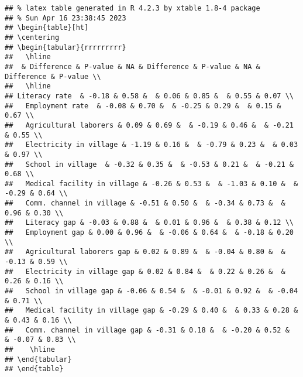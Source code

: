 \documentclass[
]{article}
\begin{document}
\begin{verbatim}
## % latex table generated in R 4.2.3 by xtable 1.8-4 package
## % Sun Apr 16 23:38:45 2023
## \begin{table}[ht]
## \centering
## \begin{tabular}{rrrrrrrrr}
##   \hline
##  & Difference & P-value & NA & Difference & P-value & NA & Difference & P-value \\ 
##   \hline
## Literacy rate  & -0.18 & 0.58 &  & 0.06 & 0.85 &  & 0.55 & 0.07 \\ 
##   Employment rate  & -0.08 & 0.70 &  & -0.25 & 0.29 &  & 0.15 & 0.67 \\ 
##   Agricultural laborers & 0.09 & 0.69 &  & -0.19 & 0.46 &  & -0.21 & 0.55 \\ 
##   Electricity in village & -1.19 & 0.16 &  & -0.79 & 0.23 &  & 0.03 & 0.97 \\ 
##   School in village  & -0.32 & 0.35 &  & -0.53 & 0.21 &  & -0.21 & 0.68 \\ 
##   Medical facility in village & -0.26 & 0.53 &  & -1.03 & 0.10 &  & -0.29 & 0.64 \\ 
##   Comm. channel in village & -0.51 & 0.50 &  & -0.34 & 0.73 &  & 0.96 & 0.30 \\ 
##   Literacy gap & -0.03 & 0.88 &  & 0.01 & 0.96 &  & 0.38 & 0.12 \\ 
##   Employment gap & 0.00 & 0.96 &  & -0.06 & 0.64 &  & -0.18 & 0.20 \\ 
##   Agricultural laborers gap & 0.02 & 0.89 &  & -0.04 & 0.80 &  & -0.13 & 0.59 \\ 
##   Electricity in village gap & 0.02 & 0.84 &  & 0.22 & 0.26 &  & 0.26 & 0.16 \\ 
##   School in village gap & -0.06 & 0.54 &  & -0.01 & 0.92 &  & -0.04 & 0.71 \\ 
##   Medical facility in village gap & -0.29 & 0.40 &  & 0.33 & 0.28 &  & 0.43 & 0.16 \\ 
##   Comm. channel in village gap & -0.31 & 0.18 &  & -0.20 & 0.52 &  & -0.07 & 0.83 \\ 
##    \hline
## \end{tabular}
## \end{table}
\end{verbatim}
\end{document}
